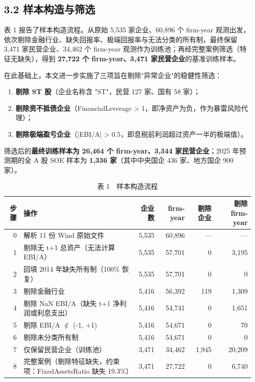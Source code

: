 \documentclass[11pt,a4paper]{ctexart}
\begin{document}
\subsection{3.2 样本构造与筛选}

表 1 报告了样本构造流程。从原始 5,535 家企业、60,896 个 firm-year 观测出发，依次剔除金融行业、缺失回报率、极端回报率与无法分类的所有制，最终保留 3,471 家民营企业、34,462 个 firm-year 观测作为训练池；再经完整案例筛选（特征无缺失），得到 \textbf{27,722 个 firm-year、3,471 家民营企业}的基准训练样本。

在此基础上，本文进一步实施了三项旨在剔除"异常企业"的稳健性筛选：

\begin{enumerate}

  \item \textbf{剔除 ST 股}（企业名称含 "ST"，民营 127 家、国有 58 家）；

  \item \textbf{剔除资不抵债企业}（FinancialLeverage > 1，即净资产为负，作为暴雷风险代理）；

  \item \textbf{剔除极端盈亏企业}（|EBI/A| > 0.5，即息税前利润超过资产一半的极端值）。

\end{enumerate}

筛选后的\textbf{最终训练样本为 26,464 个 firm-year、3,344 家民营企业}；2025 年预测期的全 A 股 SOE 样本为 \textbf{1,336 家}（其中中央国企 436 家、地方国企 900 家）。

\begin{table}[H]
\centering
\footnotesize
\caption{表 1　样本构造流程}
\begin{tabular}{rlrrrr}
\toprule
步骤 & 操作 & 企业数 & firm-year & 剔除企业 & 剔除 firm-year \\
\midrule
0 & 解析 11 份 Wind 原始文件 & 5,535 & 60,896 & --- & --- \\
1 & 剔除无 t+1 总资产（无法计算 EBI/A） & 5,535 & 57,701 & 0 & 3,195 \\
2 & 回填 2014 年缺失所有制（100\% 恢复） & 5,535 & 57,701 & 0 & 0 \\
3 & 剔除金融行业 & 5,416 & 56,392 & 119 & 1,309 \\
4 & 剔除 NaN EBI/A（缺失 t+1 净利润或利息支出） & 5,416 & 54,741 & 0 & 1,651 \\
5 & 剔除 EBI/A $\notin$ (-1, +1) & 5,416 & 54,671 & 0 & 70 \\
6 & 剔除未分类所有制 & 5,416 & 54,671 & 0 & 0 \\
7 & 仅保留民营企业（训练池） & 3,471 & 34,462 & 1,945 & 20,209 \\
8 & 完整案例（剔除特征缺失，约束项：FixedAssetsRatio 缺失 19.3\%） & 3,471 & 27,722 & 0 & 6,740 \\
\bottomrule
\end{tabular}
\end{table}
\end{document}

